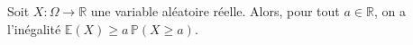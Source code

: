 Soit $X: \Omega \to \mathbb{R}$ une variable aléatoire réelle. Alors, pour tout $a\in \mathbb{R}$, on a l'inégalité $\mathbb{E}(X)\geq a\,\mathbb{P}(X\geq a)$.

\begin{reponses}
\end{reponses}

